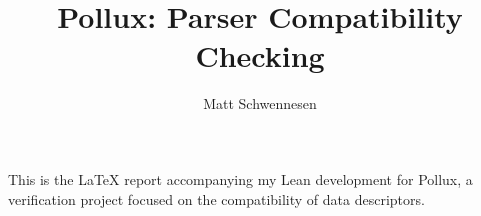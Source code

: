 \documentclass[11pt]{article}
\author{Matt Schwennesen}
\title{Pollux: Parser Compatibility Checking}
\date{}
\theoremstyle{definition}
\theoremstyle{plain}
\theoremstyle{plain}
\theoremstyle{plain}
\begin{document}
\maketitle

This is the \LaTeX{} report accompanying my Lean development for Pollux,
a verification project focused on the compatibility of data
descriptors.

\tableofcontents


























\printbibliography{}
\end{document}
